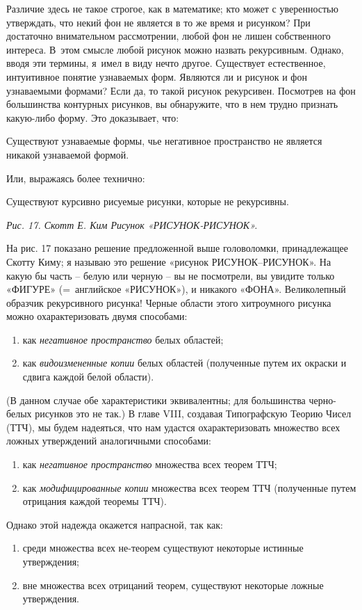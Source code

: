\documentclass[../main.tex]{subfiles}
\begin{document}
Различие здесь не такое строгое, как в математике; кто может с уверенностью утверждать, что некий фон не является в то же время и рисунком?
При достаточно внимательном рассмотрении, любой фон не лишен собственного интереса.
В~этом смысле любой рисунок можно назвать рекурсивным.
Однако, вводя эти термины, я~имел в виду нечто другое.
Существует естественное, интуитивное понятие узнаваемых форм.
Являются ли и рисунок и фон узнаваемыми формами?
Если да, то такой рисунок рекурсивен.
Посмотрев на фон большинства контурных рисунков, вы обнаружите, что в нем трудно признать какую-либо форму.
Это доказывает, что:
%
\begin{block}
    Существуют узнаваемые формы, чье негативное пространство не является никакой узнаваемой формой.
\end{block}
%
Или, выражаясь более технично:
%
\begin{block}
    Существуют курсивно рисуемые рисунки, которые не рекурсивны.
\end{block}

\emph{Рис. 17. Скотт Е. Ким Рисунок «РИСУНОК-РИСУНОК».}

На рис. 17 показано решение предложенной выше головоломки, принадлежащее Скотту Киму; я называю это решение «рисунок РИСУНОК--РИСУНОК».
На какую бы часть \--- белую или черную \--- вы не посмотрели, вы увидите только «ФИГУРЕ» (=~английское «РИСУНОК»), и никакого «ФОНА».
Великолепный образчик рекурсивного рисунка!
Черные области этого хитроумного рисунка можно охарактеризовать двумя способами:
%
\begin{enumerate}[label=(\arabic*), noitemsep, topsep=6pt, left=\parindent]
    \item как \emph{негативное пространство} белых областей;
    \item как \emph{видоизмененные копии} белых областей (полученные путем их окраски и сдвига каждой белой области).
\end{enumerate}
%
(В данном случае обе характеристики эквивалентны; для большинства черно-белых рисунков это не так.)
В главе VIII, создавая Типографскую Теорию Чисел (ТТЧ), мы будем надеяться, что нам удастся охарактеризовать множество всех ложных утверждений аналогичными способами:
%
\begin{enumerate}[label=(\arabic*), noitemsep, topsep=6pt, left=\parindent]
    \item как \emph{негативное пространство} множества всех теорем ТТЧ;
    \item как \emph{модифицированные копии} множества всех теорем ТТЧ (полученные путем отрицания каждой теоремы ТТЧ).
\end{enumerate}
%
Однако этой надежда окажется напрасной, так как:
%
\begin{enumerate}[label=(\arabic*), noitemsep, topsep=6pt, left=\parindent]
    \item среди множества всех не-теорем существуют некоторые истинные утверждения;
    \item вне множества всех отрицаний теорем, существуют некоторые ложные утверждения.
\end{enumerate}
\end{document}
